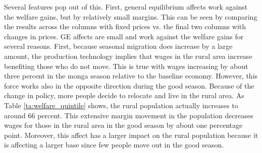 \documentclass[pdftex,11pt]{article}
\begin{document}
Several features pop out of this. First, general equilibrium affects work against the welfare gains, but by relatively small margins. This can be seen by comparing the results across the columns with fixed prices vs. the final two columns with changes in prices. GE affects are small and work against the welfare gains for several reasons. First, because seasonal migration does increase by a large amount, the production technology implies that wages in the rural area increase benefiting those who do not move. This is true with wages increasing by about three percent in the monga season relative to the baseline economy. However, this force works also in the opposite direction during the good season. Because of the change in policy, more people decide to relocate and live in the rural area. As Table \ref{ta:welfare_quintile} shows, the rural population actually increases to around 66 percent. This extensive margin movement in the population decreases wages for those in the rural area in the good season by about one percentage point. Moreover, this affect has a larger impact on the rural population because it is affecting a larger base since few people move out in the good season.
\end{document}
